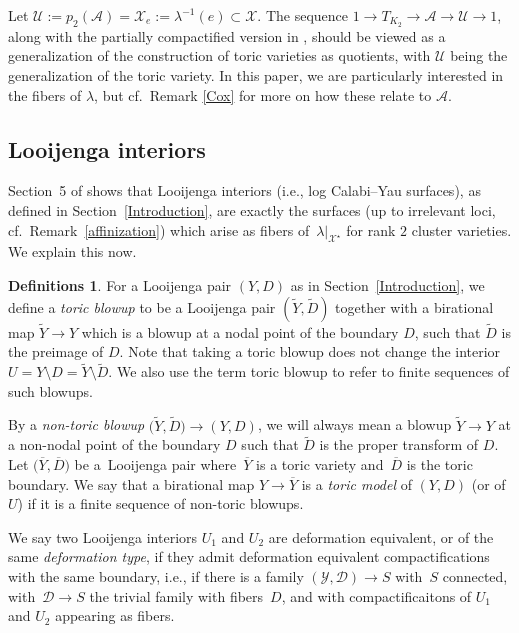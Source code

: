 \documentclass[11pt]{article}
\numberwithin{equation}{section}
\numberwithin{figure}{section}
\numberwithin{table}{section}
\let\?=\overline
\let\rar=\rightarrow
\let\s=\mathcal
\let\wt=\widetilde
\theoremstyle{definition}
\newtheorem{dfns}[thm]{Definitions}
\begin{document}
Let $\s{U}:=p_2(\s{A})=\s{X}_e:=\lambda^{-1}(e)\subset \s{X}$. The sequence $1\rar T_{K_2} \rar \s{A} \rar \s{U} \rar 1$, along with the partially compactified version in \cite[Section~2]{ManCox}, should be viewed as a generalization of the construction of toric varieties as quotients, with $\s{U}$ being the generalization of the toric variety.
 In this paper, we are particularly interested in the fibers of $\lambda$, but cf.\ Remark \ref{Cox} for more on how these relate to $\s{A}$.

\subsection{Looijenga interiors}\label{Looijenga seeds}

Section~5 of \cite{GHK3} shows that Looijenga interiors (i.e., log Calabi--Yau surfaces), as defined in Section~\ref{Introduction}, are exactly the surfaces (up to irrelevant loci, cf.\ Remark~\ref{affinization}) which arise as fibers of~$\lambda|_{\s{X}^{\star}}$ for rank $2$ cluster varieties. We explain this now.

\begin{dfns}
For a Looijenga pair $(Y,D)$ as in Section~\ref{Introduction}, we define a {\it toric blowup} to be a Looijenga pair $(\wt{Y},\wt{D})$ together with a birational map $\wt{Y}\rar Y$ which is a blowup at a nodal point of the boundary $D$, such that $\wt{D}$ is the preimage of $D$. Note that taking a toric blowup does not change the interior $U = Y\setminus D = \wt{Y}\setminus \wt{D}$. We also use the term toric blowup to refer to finite sequences of such blowups.

By a {\it non-toric blowup} $\big(\wt{Y},\wt{D}\big)\rar (Y,D)$, we will always mean a blowup $\wt{Y}\rar Y$ at a non-nodal point of the boundary $D$ such that $\wt{D}$ is the proper transform of $D$. Let $\big(\?{Y},\?{D}\big)$ be a~Looijenga pair where~$\?{Y}$ is a toric variety and~$\?{D}$ is the toric boundary. We say that a birational map $Y \rar \?{Y}$ is a {\it toric model} of $(Y,D)$ (or of $U$) if it is a finite sequence of non-toric blowups.

We say two Looijenga interiors $U_1$ and $U_2$ are deformation equivalent, or of the same \textit{deformation type}, if they admit deformation equivalent compactifications with the same boundary, i.e., if there is a family $(\s{Y},\s{D}) \rar S$ with~$S$ connected, with~$\s{D}\rar S$ the trivial family with fibers~$D$, and with compactificaitons of $U_1$ and $U_2$ appearing as fibers.
\end{dfns}
\end{document}
